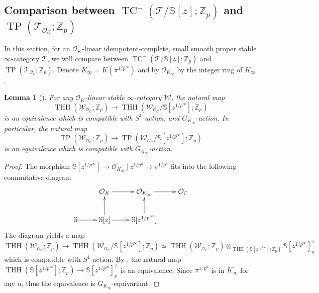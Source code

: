 \documentclass[11pt]{amsart}
\newcommand{\Z}{\mathbb{Z}}
\newcommand{\sO}{\mathcal{O}}
\newcommand{\sT}{\mathcal{T}}
\newcommand{\bS}{\mathbb{S}}
\newcommand{\THH}{\operatorname{THH}}
\newcommand{\TP}{\operatorname{TP}}
\newcommand{\TCn}{\operatorname{TC}^{-}}
\newcommand{\Cu}{\mathcal{C}}
\newtheorem{lemma}{Lemma}[section]
\theoremstyle{definition}
\theoremstyle{remark}
\numberwithin{equation}{section}
\begin{document}
\subsection{Comparison between $\TCn(\sT/\bS[z];\Z_p)$ and $\TP(\sT_{\sO_\Cu};\Z_p)$} In this section, for an $\sO_K$-linear idempotent-complete, small smooth proper stable $\infty$-category $\sT$, we will compare between $\TCn(\sT/\bS[z];\Z_p)$ and $\TP(\sT_{\sO_\Cu};\Z_p)$. Denote $K_\infty=K(\pi^{1/p^{\infty}})$ and by $\sO_{K_\infty}$ by the integer ring of $K_\infty$.
\begin{lemma}[{\cite[Corollary 11.8]{BMS2}}]\label{BMSTHHlemma}
 For any $\sO_K$-linear stable $\infty$-category $\mathcal{W}$, the natural map
 \[ \THH(\mathcal{W}_{\sO_\Cu};\Z_p) 
 \to \THH(\mathcal{W}_{\sO_\Cu}/\bS[z^{1/p^{\infty}}];\Z_p) 
 \]
 is an equivalence which is compatible with $S^1$-action, and $G_{K_\infty}$-action. In particular, the natural map
 \[ \TP(\mathcal{W}_{\sO_\Cu};\Z_p) 
 \to \TP(\mathcal{W}_{\sO_\Cu}/\bS[z^{1/p^{\infty}}];\Z_p)
 \]
 is an equivalence which is compatible with $G_{K_\infty}$-action.
\end{lemma}
\begin{proof}
The morphism $\bS[z^{1/p^{\infty}}] \to \sO_{K_\infty}~|~ z^{1/p^n}\mapsto \pi^{1/p^n}$ fits into the following commutative diagram
\begin{equation}\label{diagram}
\xymatrix{
 &\sO_K\ar[r] &\sO_{K_\infty} \ar[r] & \sO_{\Cu}\\
\bS\ar[r] &\bS[z]\ar[r] \ar[u]& \bS[z^{1/p^{\infty}}]\ar[u] &
}
\end{equation}
The diagram yields a map 
\[
\THH(\mathcal{W}_{\sO_\Cu};\Z_p) 
 \to \THH(\mathcal{W}_{\sO_\Cu}/\bS[z^{1/p^{\infty}}];\Z_p)\simeq \THH(\mathcal{W}_{\sO_\Cu};\Z_p)\otimes_{\THH(\bS[z^{1/p^{\infty}}];\Z_p)}\bS[z^{1/p^{\infty}}]^{\wedge}_{p}
\]
which is compatible with $S^1$-action. By \cite[Proposition 11.7]{BMS2}, the natural map $\THH(\bS[z^{1/p^{\infty}}];\Z_p) \to \bS[z^{1/p^{\infty}}]^{\wedge}_{p}$ is an equivalence. Since $\pi^{1/p^n}$ is in $K_\infty$ for any $n$, thus the equivalence is $G_{K_\infty}$-equivariant.
\end{proof}
\end{document}
